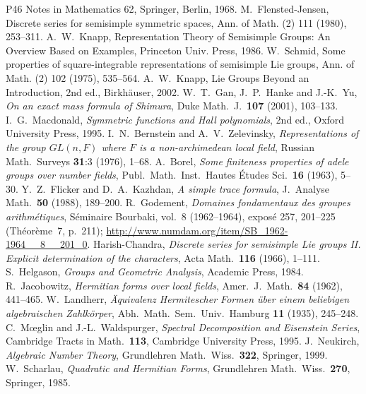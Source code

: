 \documentclass[10pt]{amsart}
\theoremstyle{definition}
\theoremstyle{remark}
\begin{document}
\begin{thebibliography}{P46}
Notes in Mathematics 62, Springer, Berlin, 1968.
 M.~Flensted-Jensen, Discrete series for semisimple symmetric spaces, Ann. of Math. (2) 111 (1980), 253--311.
 A.~W.~Knapp, Representation Theory of Semisimple Groups: An Overview Based on Examples, Princeton Univ. Press, 1986.
 W.~Schmid, Some properties of square-integrable representations of semisimple Lie groups, Ann. of Math. (2) 102 (1975), 535--564.
 A.~W.~Knapp, Lie Groups Beyond an Introduction, 2nd ed., Birkh\"auser, 2002.
 W.~T.~Gan, J.~P.~Hanke and J.-K.~Yu, \emph{On an exact mass formula of Shimura},
Duke Math.\ J.\ \textbf{107} (2001), 103--133.
 I.~G.~Macdonald, \emph{Symmetric functions and Hall polynomials}, 2nd ed.,
Oxford University Press, 1995.
 I.~N.~Bernstein and A.~V.~Zelevinsky, \emph{Representations of the group
$GL(n,F)$ where $F$ is a non-archimedean local field}, Russian Math.\ Surveys \textbf{31}:3
(1976), 1--68.
 A.~Borel, \emph{Some finiteness properties of adele groups over number
fields}, Publ.\ Math.\ Inst.\ Hautes \'Etudes Sci.\ \textbf{16} (1963), 5--30.
 Y.~Z.~Flicker and D.~A.~Kazhdan, \emph{A simple trace formula},
J.\ Analyse Math.\ \textbf{50} (1988), 189--200.
 R.~Godement, \emph{Domaines fondamentaux des groupes arithm\'etiques},
S\'eminaire Bourbaki, vol.~8 (1962--1964), expos\'e 257, 201--225 (Th\'eor\`eme~7, p.~211);
\url{http://www.numdam.org/item/SB_1962-1964__8__201_0}.
 Harish-Chandra, \emph{Discrete series for semisimple Lie groups II. Explicit
determination of the characters}, Acta Math.\ \textbf{116} (1966), 1--111.
 S.~Helgason, \emph{Groups and Geometric Analysis}, Academic Press, 1984.
 R.~Jacobowitz, \emph{Hermitian forms over local fields}, Amer.\ J.\ Math.\
\textbf{84} (1962), 441--465.
 W.~Landherr, \emph{\"Aquivalenz Hermitescher Formen \"uber einem beliebigen
algebraischen Zahlk\"orper}, Abh.\ Math.\ Sem.\ Univ.\ Hamburg \textbf{11} (1935), 245--248.
\bibitem{MW} C.~M\oe glin and J.-L.~Waldspurger, \emph{Spectral Decomposition and Eisenstein
Series}, Cambridge Tracts in Math.\ \textbf{113}, Cambridge University Press, 1995.
\bibitem{Neukirch} J.~Neukirch, \emph{Algebraic Number Theory}, Grundlehren Math.\ Wiss.\
\textbf{322}, Springer, 1999.
\bibitem{Scharlau} W.~Scharlau, \emph{Quadratic and Hermitian Forms}, Grundlehren Math.\ Wiss.\
\textbf{270}, Springer, 1985.


\end{thebibliography}
\end{document}
